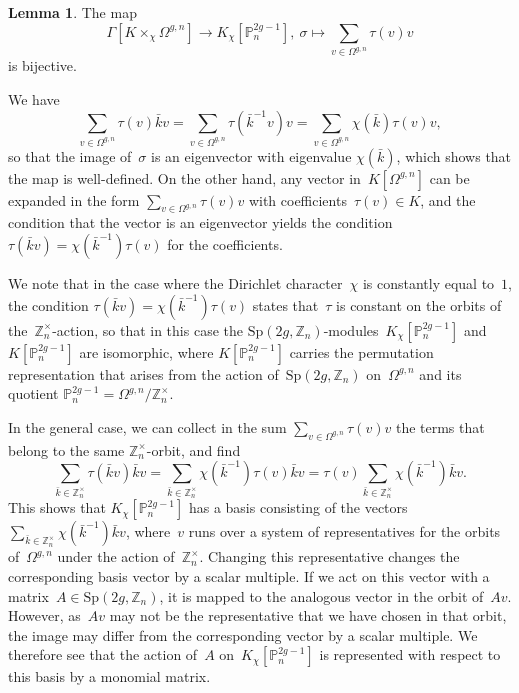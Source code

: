 \documentclass[12pt]{article}
\makeatletter
\theoremstyle{definition}
\newtheorem{Lemma}[Satz]{Lemma}
\theoremstyle{break}
\renewenvironment{proof}[1][\proofname]{\par
\vspace{-5pt}%
\pushQED{\qed}%
\normalfont
\topsep0pt \partopsep0pt %
\trivlist
\item[\hskip\labelsep
\bfseries
#1\@addpunct{.}]\ignorespaces
}{%
\popQED\endtrivlist\@endpefalse
\addvspace{6pt plus 6pt} %
}
\newcommand{\Z}{\mathbb{Z}}
\newcommand{\Sp}{\mathrm{Sp}}
\renewcommand{\P}{\mathbb{P}}
\renewcommand{\1}{\mathbbm{1}}
\renewcommand{\P}{\mathbb{P}}
\makeatother
\begin{document}
\begin{Lemma}
The map
\[\Gamma[K \times_{\chi} \Omega^{g,n}] \to K_\chi[\P^{2g-1}_n],~\sigma
\mapsto \sum_{v \in \Omega^{g,n}} \tau(v) v\]
is bijective.
\end{Lemma}
\begin{proof}
We have
\[\sum_{v \in \Omega^{g,n}} \tau(v) \bar{k} v =
\sum_{v \in \Omega^{g,n}} \tau(\bar{k}^{-1} v) v = \sum_{v \in \Omega^{g,n}} \chi(\bar{k}) \tau(v) v,\]
so that the image of~$\sigma$ is an eigenvector with eigenvalue $\chi(\bar{k})$, which shows that the map is well-defined. On the other hand, any vector in~$K[\Omega^{g,n}]$ can be expanded in the form $\sum_{v \in \Omega^{g,n}} \tau(v) v$ with coefficients~$\tau(v) \in K$, and the condition that the vector is an eigenvector yields the condition $\tau(\bar{k} v) = \chi(\bar{k}^{-1}) \tau(v)$ for the coefficients.
\end{proof}

We note that in the case where the Dirichlet character~$\chi$ is constantly equal to~$1$, the condition $\tau(\bar{k} v) = \chi(\bar{k}^{-1}) \tau(v)$ states that~$\tau$ is constant on the orbits of the~\mbox{$\Z_n^\times$-action}, so that in this case the $\Sp(2g, \Z_n)$-modules~$K_\chi[\P^{2g-1}_n]$ and~$K[\P^{2g-1}_n]$ are isomorphic, where $K[\P^{2g-1}_n]$ carries the permutation representation that arises from the action
of~$\Sp(2g, \Z_n)$ on~$\Omega^{g,n}$ and its quotient
\mbox{$\P^{2g-1}_n = \Omega^{g,n}/\Z_n^\times$}.

In the general case, we can collect in the sum $\sum_{v \in \Omega^{g,n}} \tau(v) v$ the terms that belong to the same $\Z_n^\times$-orbit, and find
\[\sum_{\bar{k} \in \Z_n^\times} \tau(\bar{k} v) \bar{k} v =
\sum_{\bar{k} \in \Z_n^\times} \chi(\bar{k}^{-1}) \tau(v) \bar{k} v =
\tau(v) \sum_{\bar{k} \in \Z_n^\times} \chi(\bar{k}^{-1}) \bar{k} v.\]
This shows that $K_\chi[\P^{2g-1}_n]$ has a basis consisting of the vectors
$\sum_{\bar{k} \in \Z_n^\times} \chi(\bar{k}^{-1}) \bar{k} v$, where~$v$ runs over a system of representatives for the orbits of~$\Omega^{g,n}$ under the action of~$\Z_n^\times$. Changing this representative changes the corresponding basis vector by a scalar multiple. If we act on this vector with a matrix~$A \in \Sp(2g,\Z_n)$, it is mapped to the analogous vector in the orbit of~$Av$. However, as~$Av$ may not be the representative that we have chosen in that orbit, the image may differ from the corresponding vector by a scalar multiple. We therefore see that the action of~$A$ on~$K_\chi[\P^{2g-1}_n]$ is represented with respect to this basis by a monomial matrix.
\end{document}
